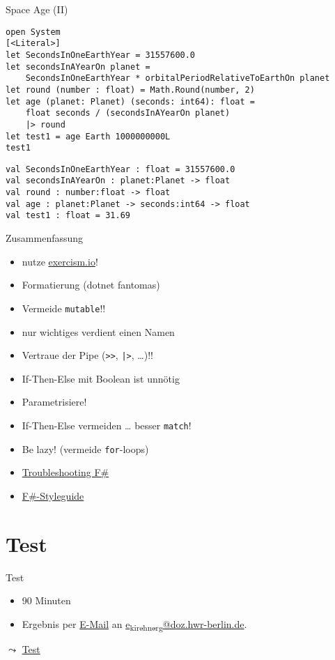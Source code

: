 \documentclass[t]{beamer}
\begin{document}
\begin{frame}[label={sec:org0814aee},fragile]{Space Age (II)}
 \begin{verbatim}
open System
[<Literal>]
let SecondsInOneEarthYear = 31557600.0
let secondsInAYearOn planet =
    SecondsInOneEarthYear * orbitalPeriodRelativeToEarthOn planet
let round (number : float) = Math.Round(number, 2)
let age (planet: Planet) (seconds: int64): float =
    float seconds / (secondsInAYearOn planet)
    |> round
let test1 = age Earth 1000000000L
test1
\end{verbatim}

\begin{verbatim}
val SecondsInOneEarthYear : float = 31557600.0
val secondsInAYearOn : planet:Planet -> float
val round : number:float -> float
val age : planet:Planet -> seconds:int64 -> float
val test1 : float = 31.69
\end{verbatim}
\end{frame}

\begin{frame}[label={sec:orgd1c45fe},fragile]{Zusammenfassung}
 \begin{itemize}
\item nutze \href{https://exercism.io}{exercism.io}!
\item Formatierung (dotnet fantomas)
\item Vermeide \texttt{mutable}!!
\item nur wichtiges verdient einen Namen
\item Vertraue der \alert{Pipe} (\texttt{>>}, \texttt{|>}, \ldots{})!!
\item If-Then-Else mit Boolean ist unnötig
\item Parametrisiere!
\item If-Then-Else vermeiden \ldots{} besser \texttt{match}!
\item Be lazy! (vermeide \texttt{for}-loops)
\item \href{https://fsharpforfunandprofit.com/troubleshooting-fsharp/}{Troubleshooting F\#}
\item \href{https://docs.microsoft.com/de-de/dotnet/fsharp/style-guide/}{F\#-Styleguide}
\end{itemize}
\end{frame}

\section{Test }
\label{sec:org881f0a5}
\begin{frame}[label={sec:orgeb745ec}]{Test}
\begin{itemize}
\item 90 Minuten
\item Ergebnis per \href{mailto://e\_kirchnerg@doz.hwr-berlin.de}{E-Mail} an \href{mailto://e\_kirchnerg@doz.hwr-berlin.de}{e\textsubscript{kirchnerg}@doz.hwr-berlin.de}.
\end{itemize}

\(\leadsto\) \href{../src/5/test.md}{Test}
\end{frame}
\end{document}
